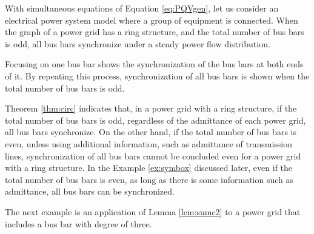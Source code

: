 \documentclass[tombow,dvipdfmx]{corona-a5-1.1}
\begin{document}
\begin{定理}
\label{thm:circ}
With simultaneous equations of Equation \ref{eq:PQVgen}, let us consider an electrical power system model where a group of equipment is connected.
When the graph of a power grid has a ring structure, and the total number of bus bars is odd, all bus bars synchronize under a steady power flow distribution.
\end{定理}

\begin{証明}
Focusing on one bus bar shows the synchronization of the bus bars at both ends of it.
By repeating this process, synchronization of all bus bars is shown when the total number of bus bars is odd.
\end{証明}


Theorem \ref{thm:circ} indicates that, in a power grid with a ring structure, if the total number of bus bars is odd, regardless of the admittance of each power grid, all bus bars synchronize.
On the other hand, if the total number of bus bars is even, unless using additional information, such as admittance of transmission lines, synchronization of all bus bars cannot be concluded even for a power grid with a ring structure.
In the Example \ref{ex:symbox} discussed later, even if the total number of bus bars is even, as long as there is some information such as admittance, all bus bars can be synchronized. 

The next example is an application of Lemma \ref{lem:sumc2} to a power grid that includes a bus bar with degree of three.

\end{document}
